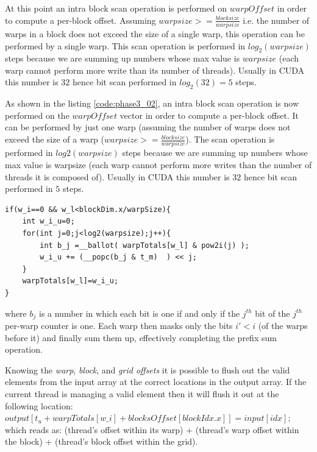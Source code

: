 At this point an  intra block scan operation is performed on \(warpOffset\) in order to compute a per-block offset. Assuming \( warpsize >= \frac{blocksize}{warpsize} \) i.e. the number of warps in a block does not exceed the size of a single warp, this operation can be performed by a single warp. This scan operation is performed in \(log_2(warpsize)\) steps because we are summing up numbers whose max value is $warpsize$ (each warp cannot perform more write than its number of threads). Usually in CUDA this number is $32$ hence bit scan performed in \(log_2(32)=5\) steps.

As shown in the listing \ref{code:phase3_02}, an intra block scan operation is now performed on the \(warpOffset\) vector in order to compute a per-block offset. It can be performed by just one warp (assuming the number of warps does not exceed the size of a warp (\( warpsize >= \frac{blocksize}{warpsize} \)). The scan operation is performed in \(log2(warpsize)\) steps because we are summing up numbers whose max value is warpsize (each warp cannot perform more writes than the number of threads it is composed of). Usually in CUDA this number is $32$ hence bit scan performed in $5$ steps.
\begin{lstlisting}
if(w_i==0 && w_l<blockDim.x/warpSize){
	int w_i_u=0;
	for(int j=0;j<log2(warpsize);j++){
		int b_j =__ballot( warpTotals[w_l] & pow2i(j) );
		w_i_u += (__popc(b_j & t_m)  ) << j;
	}
	warpTotals[w_l]=w_i_u;
}
\end{lstlisting}
where \(b_j\) is a number in which each bit is one if and only if the \(j^{th}\) bit of the \(j^{th}\) per-warp counter  is one.
Each warp then masks only the bits \(i'< i\) (of the warps before it)
and finally sum them up, effectively completing the prefix sum operation.


Knowing the \textit{warp}, \textit{block}, and \textit{grid offsets} it is possible to flush out the valid elements from the input array at the correct locations in the output array. If the current thread is managing a valid element then it will flush it out at the following location: 
$	output[t_u+warpTotals[w\_i]+blocksOffset[blockIdx.x]]= input[idx];$
which reads as: (thread's offset within its warp) + (thread's warp offset within the block) + (thread's block offset within the grid).


